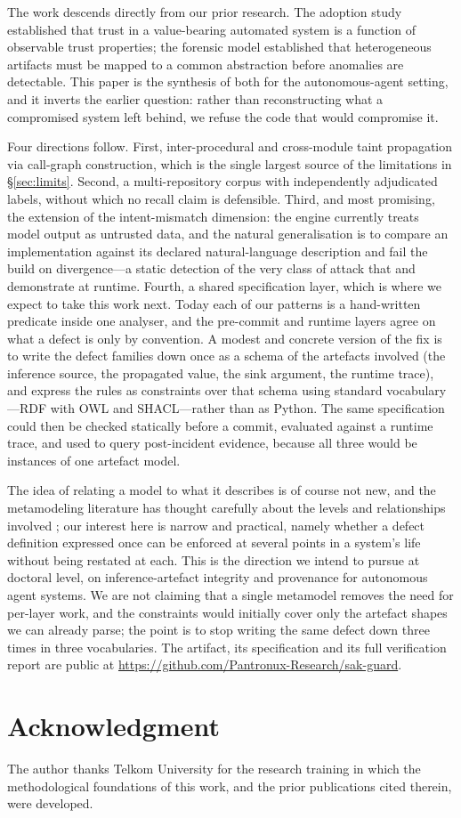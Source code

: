 The work descends directly from our prior research. The adoption study
\cite{firmansyah2022efficacy} established that trust in a value-bearing
automated system is a function of observable trust properties; the forensic
model \cite{firmansyah2024forensic} established that heterogeneous artifacts
must be mapped to a common abstraction before anomalies are detectable. This
paper is the synthesis of both for the autonomous-agent setting, and it
inverts the earlier question: rather than reconstructing what a compromised
system left behind, we refuse the code that would compromise it.

Four directions follow. First, inter-procedural and cross-module taint
propagation via call-graph construction, which is the single largest source of
the limitations in \S\ref{sec:limits}. Second, a multi-repository corpus with
independently adjudicated labels, without which no recall claim is defensible.
Third, and most promising, the extension of the intent-mismatch dimension: the
engine currently treats model output as untrusted data, and the natural
generalisation is to compare an implementation against its declared
natural-language description and fail the build on divergence---a static
detection of the very class of attack that \cite{greshake2023notwhat} and
\cite{zhan2024injecagent} demonstrate at runtime. Fourth, a shared specification layer, which is
where we expect to take this work next. Today each of our patterns is a
hand-written predicate inside one analyser, and the pre-commit and runtime
layers agree on what a defect is only by convention. A modest and concrete
version of the fix is to write the defect families down once as a schema of the
artefacts involved (the inference source, the propagated value, the sink
argument, the runtime trace), and express the rules as constraints over that
schema using standard vocabulary---RDF with \mbox{OWL} and \mbox{SHACL}---rather
than as Python. The same specification could then be checked statically before a
commit, evaluated against a runtime trace, and used to query post-incident
evidence, because all three would be instances of one artefact model.

The idea of relating a model to what it describes is of course not new, and the
metamodeling literature has thought carefully about the levels and relationships
involved \cite{kuhne2022multilevel}; our interest here is narrow and practical,
namely whether a defect definition expressed once can be enforced at several
points in a system's life without being restated at each. This is the direction
we intend to pursue at doctoral level, on inference-artefact integrity and
provenance for autonomous agent systems. We are not claiming that a single
metamodel removes the need for per-layer work, and the constraints would
initially cover only the artefact shapes we can already parse; the point is to
stop writing the same defect down three times in three vocabularies. The artifact, its specification and its full
verification report are public at
\url{https://github.com/Pantronux-Research/sak-guard}.

\section*{Acknowledgment}

The author thanks Telkom University for the research training in which the
methodological foundations of this work, and the prior publications cited
therein, were developed.





